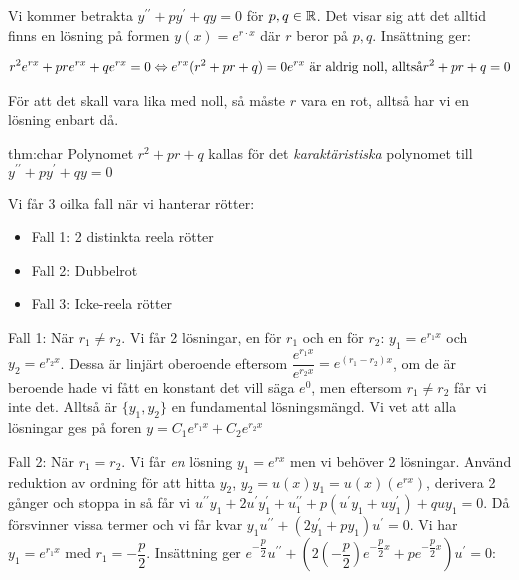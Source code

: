 \noindent Vi kommer betrakta $y^{\prime\prime}+py^{\prime}+qy=0$ för $p, q \in\mathbb{R}$. Det visar sig att det alltid finns en lösning på formen $y(x)=e^{r\cdot x}$ där $r$ beror på $p, q$. Insättning ger:


\begin{equation*}
  \begin{gathered}
    r^2e^{rx}+pre^{rx}+qe^{rx}=0 \Leftrightarrow e^{rx}(r^2+pr+q)=0
    \text{$e^{rx}$ är aldrig noll, alltså} r^2+pr+q=0
  \end{gathered}
\end{equation*}
\par\bigskip
\noindent För att det skall vara lika med noll, så måste $r$ vara en rot, alltså har vi en lösning enbart då.
\par\bigskip

\begin{theo}{thm:char}
  Polynomet $r^2+pr+q$ kallas för det \textit{karaktäristiska} polynomet till $y^{\prime\prime}+py^{\prime}+qy=0$
\end{theo}
\par\bigskip

\noindent Vi får 3 oilka fall när vi hanterar rötter:

\begin{itemize}
  \item Fall 1: 2 distinkta reela rötter
  \item Fall 2: Dubbelrot
  \item Fall 3: Icke-reela rötter
\end{itemize}
\par\bigskip

\noindent Fall 1: När $r_1\neq r_2$. Vi får 2 lösningar, en för $r_1$ och en för $r_2$: $y_1=e^{r_1x}$ och $y_2=e^{r_2x}$. Dessa är linjärt oberoende eftersom $\dfrac{e^{r_1x}}{e^{r_2x}}=e^{(r_1-r_2)x}$, om de är beroende hade vi fått en konstant det vill säga $e^0$, men eftersom $r_1\neq r_2$ får vi inte det. Alltså är $\{y_1, y_2\}$ en fundamental lösningsmängd. Vi vet att alla lösningar ges på foren $y=C_1e^{r_1x}+C_2e^{r_2x}$
\par\bigskip

\noindent Fall 2: När $r_1=r_2$. Vi får \textit{en} lösning $y_1=e^{rx}$ men vi behöver 2 lösningar. Använd reduktion av ordning för att hitta $y_2$, $y_2 = u(x)y_1 = u(x)(e^{rx})$, derivera 2 gånger och stoppa in så får vi $u^{\prime\prime}y_1+2u^{\prime}y_{1}^{\prime}+u_{1}^{\prime\prime}+p(u^{\prime}y_1+uy_{1}^{\prime})+quy_1=0$. Då försvinner vissa termer och vi får kvar $y_1u^{\prime\prime}+(2y_{1}^{\prime}+py_{1})u^{\prime}=0$. Vi har $y_1=e^{r_1x}$ med $r_1=-\dfrac{p}{2}$. Insättning ger $e^{-\dfrac{p}{2}}u^{\prime\prime}+(2(-\dfrac{p}{2})e^{-\dfrac{p}{2}x}+pe^{-\dfrac{p}{2}x})u^{\prime}=0$:


